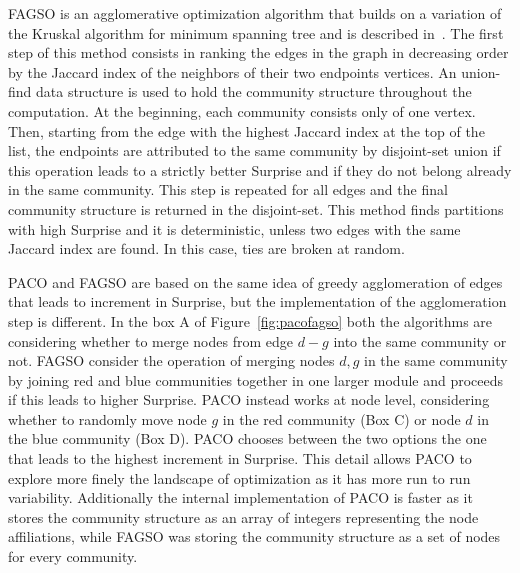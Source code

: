 FAGSO is an agglomerative optimization algorithm that builds on a variation of the Kruskal algorithm for minimum spanning tree and is described in~\cite{nicolini2016}. The first step of this method consists in ranking the edges in the graph in decreasing order by the Jaccard index of the neighbors of their two endpoints vertices. An union-find data structure is used to hold the community structure throughout the computation. At the beginning, each community consists only of one vertex. Then, starting from the edge with the highest Jaccard index at the top of the list, the endpoints are attributed to the same community by disjoint-set union if this operation leads to a strictly better Surprise and if they do not belong already in the same community. This step is repeated for all edges and the final community structure is returned in the disjoint-set. This method finds partitions with high Surprise and it is deterministic, unless two edges with the same Jaccard index are found. In this case, ties are broken at random. 

PACO and FAGSO are based on the same idea of greedy agglomeration of edges that leads to increment in Surprise, but the implementation of the agglomeration step is different.
In the box A of Figure~\ref{fig:pacofagso} both the algorithms are considering whether to merge nodes from edge $d-g$ into the same community or not.
FAGSO consider the operation of merging nodes $d,g$ in the same community by joining red and blue communities together in one larger module and proceeds if this leads to higher Surprise.
PACO instead works at node level, considering whether to randomly move node $g$ in the red community (Box C) or node $d$ in the blue community (Box D). PACO chooses between the two options the one that leads to the highest increment in Surprise.
This detail allows PACO to explore more finely the landscape of optimization as it has more run to run variability. Additionally the internal implementation of PACO is faster as it stores the community structure as an array of integers representing the node affiliations, while FAGSO was storing the community structure as a set of nodes for every community.



